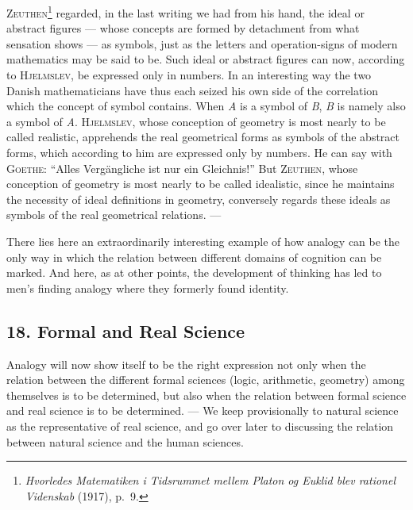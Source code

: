 \documentclass[12pt]{book}
\newcommand{\opage}[1]{\marginnote{\footnotesize\textit{[#1]}}}
\begin{document}
\textsc{Zeuthen}\footnote{\textit{Hvorledes Matematiken i Tidsrummet mellem Platon
og Euklid blev rationel Videnskab} (1917), p.\ 9.} regarded, in the last writing
we had from his hand, the ideal or abstract figures --- whose concepts are formed
by detachment from what sensation shows --- as symbols, just as the letters and
operation-signs of modern mathematics may be said to be. Such ideal or abstract
figures can now, according to \textsc{Hjelmslev}, be expressed only in numbers. In
an interesting way the two Danish mathematicians have thus each seized his own
side of the correlation which the concept of symbol contains. When \textit{A} is a
symbol of \textit{B}, \textit{B} is namely also a symbol of \textit{A}.
\textsc{Hjelmslev}, whose conception of geometry is most nearly to be called
realistic, apprehends the real geometrical forms as symbols of the abstract forms,
which according to him are expressed only by numbers. He can say with
\textsc{Goethe:} ``Alles Vergängliche ist nur ein Gleichnis!'' But
\textsc{Zeuthen}, whose conception of geometry is most nearly to be called
idealistic, since he maintains the necessity of ideal definitions in geometry,
conversely regards these ideals as symbols of the real geometrical relations. ---

There lies here an extraordinarily interesting example of how analogy can be the
only way in which the relation between different domains of cognition can be
marked. And here, as at other points, the development of thinking has led to
men's finding analogy where they formerly found identity.

\subsection*{18. Formal and Real Science}

\opage{89}Analogy will now show itself to be the right expression not only when the
relation between the different formal sciences (logic, arithmetic, geometry)
among themselves is to be determined, but also when the relation between formal
science and real science is to be determined. --- We keep provisionally to
natural science as the representative of real science, and go over later to
discussing the relation between natural science and the human sciences.
\end{document}
